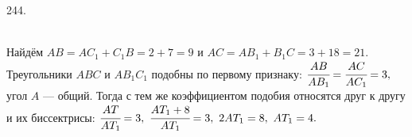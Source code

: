 244. \begin{figure}[ht!]
\end{figure}\\
Найдём $AB=AC_1+C_1B=2+7=9$ и $AC=AB_1+B_1C=3+18=21.$ Треугольники $ABC$ и $AB_1C_1$ подобны по первому признаку: $\cfrac{AB}{AB_1}=\cfrac{AC}{AC_1}=3,$ угол $A$ --- общий. Тогда с тем же коэффициентом подобия относятся друг к другу и их биссектрисы: $\cfrac{AT}{AT_1}=3,\ \cfrac{AT_1+8}{AT_1}=3,\ 2AT_1=8,\ AT_1=4.$\\
